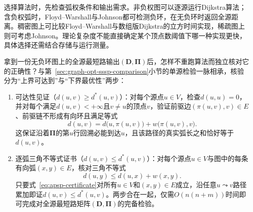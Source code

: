 选择算法时，先检查弧权条件和输出需求。非负权图可以逐源运行Dijkstra算法；含负权弧时，Floyd--Warshall与Johnson都可检测负环，在无负环时返回全源距离。稠密图上可比较Floyd--Warshall与数组版Dijkstra的立方时间实现，稀疏图上则可考虑Johnson。理论复杂度不能直接确定某个顶点数阈值下哪一种实现更快，具体选择还需结合存储与运行测量。

拿到一份无负环图上的全源最短路输出$(\bm D,\bm\Pi)$后，怎样不重跑算法而独立核对它的正确性？与第~\ref{sec:graph-opt-sssp-comparison}小节的单源检验一脉相承，核验分为“上界可达到”与“下界最优性”两步：
\begin{enumerate}
  \item 可达性见证（$d(u,v)\geq d^*(u,v)$）：对每个源点$u\in V$，检查$d(u,u)=0$，并对每个满足$d(u,v)<+\infty$且$v\neq u$的顶点$v$，验证前驱边$(\pi(u,v),v)\in E$、前驱链不形成有向环且满足等式
  \[
    d(u,v) = d\bigl(u,\pi(u,v)\bigr) + w\bigl(\pi(u,v),v\bigr).
  \]
  这保证沿着$\bm\Pi$的第$u$行回溯必能到达$u$，且该路径的真实弧长之和恰好等于$d(u,v)$。
  \item 逐弧三角不等式证书（$d(u,v)\leq d^*(u,v)$）：对每个源点$u\in V$与图中的每条有向弧$(x,y)\in E$，核对三角不等式
  \begin{equation}
    d(u,y) \leq d(u,x) + w(x,y).
    \label{eq:apsp-certificate}
  \end{equation}
  只要式~\eqref{eq:apsp-certificate}对所有$u\in V$和$(x,y)\in E$成立，沿任意$u\leadsto v$路径累加即证$d(u,v)\leq d^*(u,v)$。两步合在一起，仅需$O(n(n+m))$时间即可完成对全源最短路矩阵$(\bm D,\bm\Pi)$的完备检验。
\end{enumerate}
